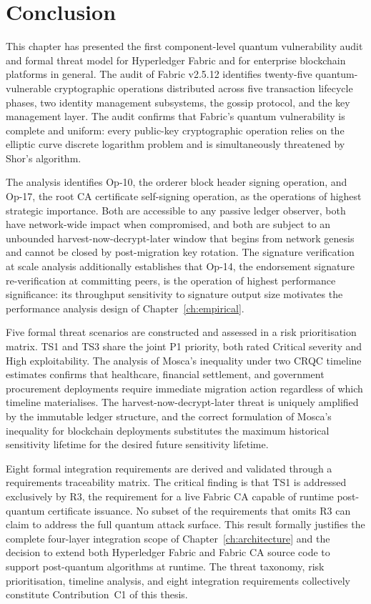 \documentclass[conference]{IEEEtran}
\begin{document}
\section{Conclusion}
\label{sec:tm_conclusion}

This chapter has presented the first component-level quantum vulnerability
audit and formal threat model for Hyperledger Fabric and for enterprise
blockchain platforms in general. The audit of Fabric v2.5.12 identifies
twenty-five quantum-vulnerable cryptographic operations distributed across
five transaction lifecycle phases, two identity management subsystems,
the gossip protocol, and the key management layer. The audit confirms
that Fabric's quantum vulnerability is complete and uniform: every
public-key cryptographic operation relies on the elliptic curve discrete
logarithm problem and is simultaneously threatened by Shor's algorithm.

The analysis identifies Op-10, the orderer block header signing operation,
and Op-17, the root CA certificate self-signing operation, as the
operations of highest strategic importance. Both are accessible to any
passive ledger observer, both have network-wide impact when compromised,
and both are subject to an unbounded harvest-now-decrypt-later window
that begins from network genesis and cannot be closed by post-migration
key rotation. The signature verification at scale analysis additionally
establishes that Op-14, the endorsement signature re-verification at
committing peers, is the operation of highest performance significance:
its throughput sensitivity to signature output size motivates the
performance analysis design of Chapter~\ref{ch:empirical}.

Five formal threat scenarios are constructed and assessed in a risk
prioritisation matrix. TS1 and TS3 share the joint P1 priority, both
rated Critical severity and High exploitability. The analysis of Mosca's
inequality under two CRQC timeline estimates confirms that healthcare,
financial settlement, and government procurement deployments require
immediate migration action regardless of which timeline materialises.
The harvest-now-decrypt-later threat is uniquely amplified by the
immutable ledger structure, and the correct formulation of Mosca's
inequality for blockchain deployments substitutes the maximum historical
sensitivity lifetime for the desired future sensitivity lifetime.

Eight formal integration requirements are derived and validated through
a requirements traceability matrix. The critical finding is that TS1
is addressed exclusively by R3, the requirement for a live Fabric CA
capable of runtime post-quantum certificate issuance. No subset of the
requirements that omits R3 can claim to address the full quantum attack
surface. This result formally justifies the complete four-layer
integration scope of Chapter~\ref{ch:architecture} and the decision
to extend both Hyperledger Fabric and Fabric CA source code to support
post-quantum algorithms at runtime. The threat taxonomy, risk
prioritisation, timeline analysis, and eight integration requirements
collectively constitute Contribution~C1 of this thesis.





\end{document}
